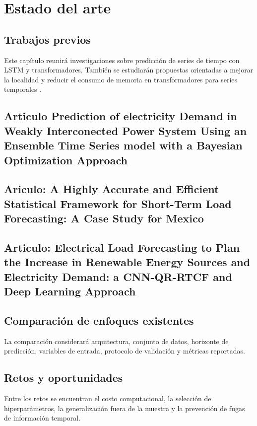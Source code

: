 \chapter{Estado del arte}

\section{Trabajos previos}

Este capítulo reunirá investigaciones sobre predicción de series de tiempo con LSTM y transformadores. También se estudiarán propuestas orientadas a mejorar la localidad y reducir el consumo de memoria en transformadores para series temporales \cite{li2019enhancing}.

\section{Articulo Prediction of electricity Demand in Weakly Interconected Power System Using an Ensemble Time Series model with a Bayesian Optimization Approach}

\section{Ariculo: A Highly Accurate and Efficient Statistical Framework for Short-Term Load Forecasting: A Case Study for Mexico}

\section{Articulo: Electrical Load Forecasting to Plan the Increase in Renewable Energy Sources and Electricity Demand: a CNN-QR-RTCF and Deep Learning Approach}

\section{Comparación de enfoques existentes}

La comparación considerará arquitectura, conjunto de datos, horizonte de predicción, variables de entrada, protocolo de validación y métricas reportadas.

\section{Retos y oportunidades}

Entre los retos se encuentran el costo computacional, la selección de hiperparámetros, la generalización fuera de la muestra y la prevención de fugas de información temporal.
